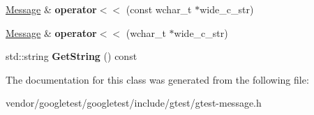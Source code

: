 \begin{DoxyCompactItemize}
\item 
\hyperlink{classtesting_1_1Message}{Message} \& {\bfseries operator$<$$<$} (const wchar\+\_\+t $\ast$wide\+\_\+c\+\_\+str)\hypertarget{classtesting_1_1Message_a34774e225944cb6df02db9689d312aae}{}\label{classtesting_1_1Message_a34774e225944cb6df02db9689d312aae}

\item 
\hyperlink{classtesting_1_1Message}{Message} \& {\bfseries operator$<$$<$} (wchar\+\_\+t $\ast$wide\+\_\+c\+\_\+str)\hypertarget{classtesting_1_1Message_aae57eefb3a72a19c11453d630b1d846c}{}\label{classtesting_1_1Message_aae57eefb3a72a19c11453d630b1d846c}

\item 
std\+::string {\bfseries Get\+String} () const \hypertarget{classtesting_1_1Message_abe8c1b7584aa670dd0e2413e8317a937}{}\label{classtesting_1_1Message_abe8c1b7584aa670dd0e2413e8317a937}

\end{DoxyCompactItemize}


The documentation for this class was generated from the following file\+:\begin{DoxyCompactItemize}
\item 
vendor/googletest/googletest/include/gtest/gtest-\/message.\+h\end{DoxyCompactItemize}
